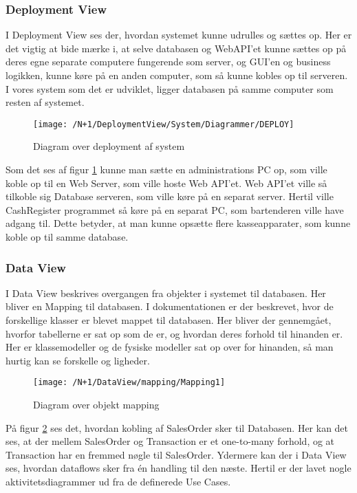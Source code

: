 \subsubsection{Deployment View}
I Deployment View ses der, hvordan systemet kunne udrulles og sættes op. Her er det vigtig at bide mærke i, at selve databasen og \gls{WebAPI}'et kunne sættes op på deres egne separate computere fungerende som server, og GUI'en og business logikken, kunne køre på en anden computer, som så kunne kobles op til serveren. I vores system som det er udviklet, ligger databasen på samme computer som resten af systemet. \newline\newline
\begin{figure}[H]
	\centering
	\texttt{[image: /N+1/DeploymentView/System/Diagrammer/DEPLOY]}
	\caption{Diagram over deployment af system}
	\label{fig:DeplayDia}
\end{figure}
Som det ses af figur \ref{fig:DeplayDia} kunne man sætte en administrations PC op, som ville koble op til en Web Server, som ville hoste Web API'et. Web API'et ville så tilkoble sig Database serveren, som ville køre på en separat server. Hertil ville CashRegister programmet så køre på en separat PC, som bartenderen ville have adgang til. Dette betyder, at man kunne opsætte flere kasseapparater, som kunne koble op til samme database.  

\subsubsection{Data View}
I Data View beskrives overgangen fra objekter i systemet til databasen. Her bliver en Mapping til databasen.\newline\newline
I dokumentationen er der beskrevet, hvor de forskellige klasser er blevet mappet til databasen. Her bliver der gennemgået, hvorfor tabellerne er sat op som de er, og hvordan deres forhold til hinanden er. Her er klassemodeller og de fysiske modeller sat op over for hinanden, så man hurtig kan se forskelle og ligheder.

\begin{figure}[H]
	\centering
	\texttt{[image: /N+1/DataView/mapping/Mapping1]}
	\caption{Diagram over objekt mapping}
	\label{MapDia}
\end{figure}	

På figur \ref{MapDia} ses det, hvordan kobling af SalesOrder sker til Databasen. Her kan det ses, at der mellem SalesOrder og Transaction er et one-to-many forhold, og at Transaction har en fremmed nøgle til SalesOrder.\newline\newline
Ydermere kan der i Data View ses, hvordan dataflows sker fra én handling til den næste. Hertil er der lavet nogle aktivitetsdiagrammer ud fra de definerede Use Cases. 

